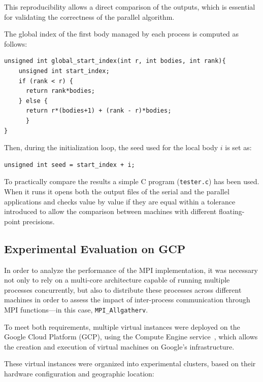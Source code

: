 \documentclass{article}
\begin{document}
This reproducibility allows a direct comparison of the outputs, which is essential for validating the correctness of the parallel algorithm.

The global index of the first body managed by each process is computed as follows:
\begin{lstlisting}
unsigned int global_start_index(int r, int bodies, int rank){
    unsigned int start_index;
    if (rank < r) {
      return rank*bodies;
    } else {
      return r*(bodies+1) + (rank - r)*bodies;
      }
}
\end{lstlisting}
Then, during the initialization loop, the seed used for the local body $i$ is set as:
\begin{lstlisting}
unsigned int seed = start_index + i;
\end{lstlisting}

To practically compare the results a simple C program (\texttt{tester.c}) has been used.
When it runs it opens both the output files of the serial and the parallel applications and checks value by value if they are equal within a tolerance introduced to allow the comparison between machines with different floating-point precisions.

\subsection{Experimental Evaluation on GCP}
\label{subsec:gcp_experiments}
In order to analyze the performance of the MPI implementation, it was necessary not only to rely on a multi-core architecture capable of running multiple processes concurrently, but also to distribute these processes across different machines in order to assess the impact of inter-process communication through MPI functions—in this case, \texttt{MPI\_Allgatherv}.  

To meet both requirements, multiple virtual instances were deployed on the Google Cloud Platform (GCP), using the Compute Engine service~\cite{gcp_compute}, which allows the creation and execution of virtual machines on Google’s infrastructure.

These virtual instances were organized into experimental clusters, based on their hardware configuration and geographic location:
\end{document}
